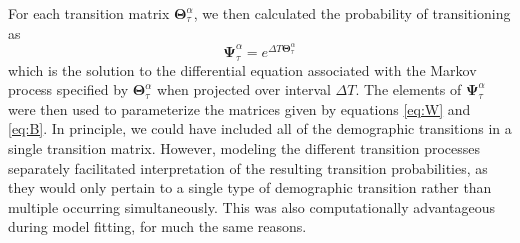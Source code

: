 For each transition matrix $\boldsymbol\Theta^{\alpha}_{\tau}$, 
we then calculated the probability of transitioning as
%
\begin{equation} \label{eq:Psi}
\boldsymbol\Psi^{\alpha}_{\tau} = e^{\Delta T\boldsymbol\Theta^{\alpha}_{\tau}}
\end{equation}
%
which is the solution to the differential equation associated with the Markov process
specified by $\boldsymbol\Theta^{\alpha}_{\tau}$ 
when projected over interval $\Delta T$.
The elements of $\boldsymbol\Psi^{\alpha}_{\tau}$ were then used to parameterize
the matrices given by equations \ref{eq:W} and \ref{eq:B}.
In principle, we could have included all of the demographic transitions in a single
transition matrix. 
However, modeling the different transition processes separately facilitated interpretation
of the resulting transition probabilities, as they would only pertain to a single type 
of demographic transition rather than multiple occurring simultaneously.
This was also computationally advantageous during model fitting, 
for much the same reasons.
